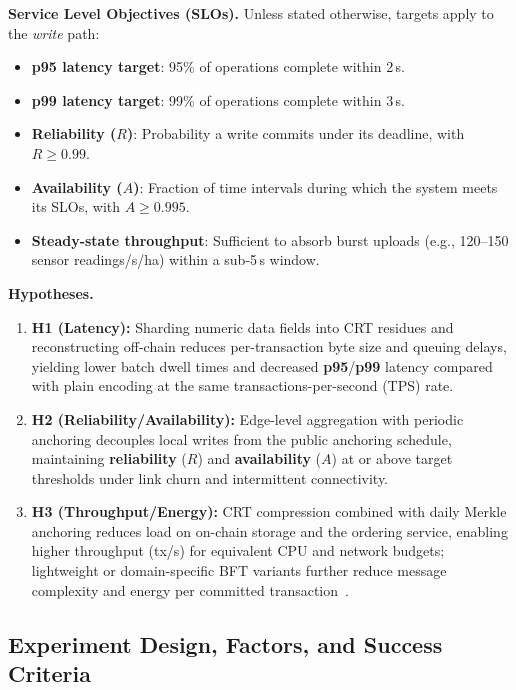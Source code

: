 \documentclass[12pt,onecolumn]{IEEEtran} %
\begin{document}
\textbf{Service Level Objectives (SLOs).}
Unless stated otherwise, targets apply to the \emph{write} path:
\begin{itemize}
    \item \textbf{p95 latency target}: 95\% of operations complete within 2\,s.
    \item \textbf{p99 latency target}: 99\% of operations complete within 3\,s.
    \item \textbf{Reliability ($R$)}: Probability a write commits under its deadline, with $R \geq 0.99$.
    \item \textbf{Availability ($A$)}: Fraction of time intervals during which the system meets its SLOs, with $A \geq 0.995$.
    \item \textbf{Steady-state throughput}: Sufficient to absorb burst uploads (e.g., 120–150 sensor readings/s/ha) within a sub-5\,s window.
\end{itemize}

\textbf{Hypotheses.}
\begin{enumerate}[leftmargin=*, itemsep=0.4em]
  \item \textbf{H1 (Latency):} Sharding numeric data fields into CRT residues and reconstructing off-chain reduces per-transaction byte size and queuing delays, yielding lower batch dwell times and decreased \textbf{p95}/\textbf{p99} latency compared with plain encoding at the same transactions-per-second (TPS) rate.
  \item \textbf{H2 (Reliability/Availability):} Edge-level aggregation with periodic anchoring decouples local writes from the public anchoring schedule, maintaining \textbf{reliability} ($R$) and \textbf{availability} ($A$) at or above target thresholds under link churn and intermittent connectivity.
  \item \textbf{H3 (Throughput/Energy):} CRT compression combined with daily Merkle anchoring reduces load on on-chain storage and the ordering service, enabling higher throughput (tx/s) for equivalent CPU and network budgets; lightweight or domain-specific BFT variants further reduce message complexity and energy per committed transaction~\cite{haque2024scalable,coinspaid2023dag}.
\end{enumerate}

\subsection{Experiment Design, Factors, and Success Criteria}
\label{sec:exp-design}
\end{document}
